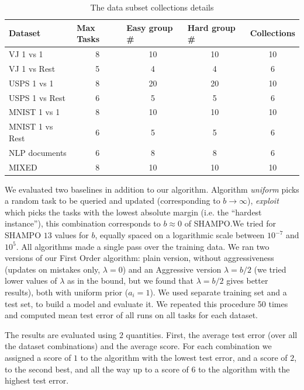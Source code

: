 \begin{table}[h]
\centering
\caption{The data subset collections details}
\label{tab:collections}
\begin{tabular}{|l|c|c|c|c|}
\hline
Dataset & \multicolumn{1}{l|}{Max Tasks} & \multicolumn{1}{l|}{Easy group \#} & \multicolumn{1}{l|}{Hard group \#} & \multicolumn{1}{l|}{Collections} \\ \hline
VJ 1 vs 1 & 8 & 10 & 10 & 10 \\ \cline{1-1}
VJ 1 vs Rest & 5 & 4 & 4 & 6 \\ \cline{1-1}
USPS 1 vs 1 & 8 & 20 & 20 & 10 \\ \cline{1-1}
USPS 1 vs Rest & 6 & 5 & 5 & 6 \\ \cline{1-1}
MNIST 1 vs 1 & 8 & 10 & 10 & 10 \\ \cline{1-1}
MNIST 1 vs Rest & 6 & 5 & 5 & 6 \\ \cline{1-1}
NLP documents & 6 & 8 & 8 & 6 \\ \cline{1-1}
MIXED & 8 & 10 & 10 & 10 \\ \hline
\end{tabular}
\end{table}


We evaluated two baselines in addition to our algorithm. Algorithm {\em uniform} picks a random task to be 
queried and updated (corresponding to $b\rightarrow\infty$), {\em exploit} which picks the tasks with the 
lowest absolute margin (i.e. the ``hardest instance''), this combination corresponds to $b \approx 0$ of 
SHAMPO.\@ We tried for SHAMPO $13$ values for $b$, equally spaced on a logarithmic scale between 
$10^{-7}$ and $10^{5}$. 
All algorithms made a single pass over the training data. We ran two versions of our First Order algorithm: 
plain version, without aggressiveness (updates on mistakes only, $\lambda=0$) and an 
Aggressive version $\lambda=b/2$ (we tried lower values of $\lambda$ as in the bound, 
but we found that $\lambda=b/2$ gives better results), both with uniform prior ($a_i=1$). 
We used separate training set and a test set, to build a model and evaluate it. We repeated this procedure 
50 times and computed mean test error of all runs on all tasks for each dataset. 

The results are evaluated using $2$ quantities. First, the average test error (over all the dataset combinations) 
and the average score. For each combination we assigned a score of $1$ to the algorithm with the lowest 
test error, and a score of $2$, to the second best, and all the way up to a score of $6$ to the algorithm with 
the highest test error.



